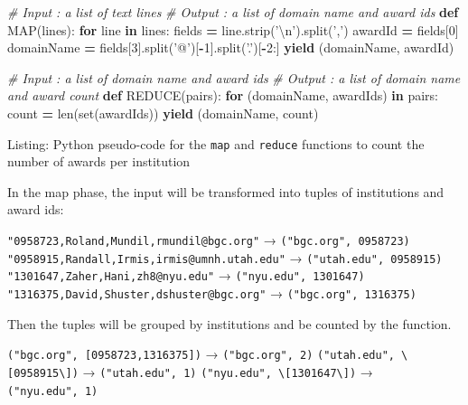 \documentclass[]{krantz}
\newenvironment{Shaded}{\begin{snugshade}}{\end{snugshade}}
\newcommand{\KeywordTok}[1]{\textcolor[rgb]{0.13,0.29,0.53}{\textbf{#1}}}
\newcommand{\DecValTok}[1]{\textcolor[rgb]{0.00,0.00,0.81}{#1}}
\newcommand{\CharTok}[1]{\textcolor[rgb]{0.31,0.60,0.02}{#1}}
\newcommand{\StringTok}[1]{\textcolor[rgb]{0.31,0.60,0.02}{#1}}
\newcommand{\CommentTok}[1]{\textcolor[rgb]{0.56,0.35,0.01}{\textit{#1}}}
\newcommand{\ControlFlowTok}[1]{\textcolor[rgb]{0.13,0.29,0.53}{\textbf{#1}}}
\newcommand{\OperatorTok}[1]{\textcolor[rgb]{0.81,0.36,0.00}{\textbf{#1}}}
\newcommand{\BuiltInTok}[1]{#1}
\newcommand{\NormalTok}[1]{#1}
\begin{document}
\begin{Shaded}
\begin{Highlighting}[]
\CommentTok{# Input  : a list of text lines}
\CommentTok{# Output : a list of domain name and award ids}
\KeywordTok{def}\NormalTok{ MAP(lines):}
    \ControlFlowTok{for}\NormalTok{ line }\KeywordTok{in}\NormalTok{ lines:}
\NormalTok{        fields     }\OperatorTok{=}\NormalTok{ line.strip(}\StringTok{'}\CharTok{\textbackslash{}n}\StringTok{'}\NormalTok{).split(}\StringTok{','}\NormalTok{)}
\NormalTok{        awardId    }\OperatorTok{=}\NormalTok{ fields[}\DecValTok{0}\NormalTok{]}
\NormalTok{        domainName }\OperatorTok{=}\NormalTok{ fields[}\DecValTok{3}\NormalTok{].split(}\StringTok{'@'}\NormalTok{)[}\OperatorTok{-}\DecValTok{1}\NormalTok{].split(}\StringTok{'.'}\NormalTok{)[}\OperatorTok{-}\DecValTok{2}\NormalTok{:]}
        \ControlFlowTok{yield}\NormalTok{ (domainName, awardId)}

\CommentTok{# Input  : a list of domain name and award ids}
\CommentTok{# Output : a list of domain name and award count}
\KeywordTok{def}\NormalTok{ REDUCE(pairs):}
    \ControlFlowTok{for}\NormalTok{ (domainName, awardIds) }\KeywordTok{in}\NormalTok{ pairs:}
\NormalTok{        count }\OperatorTok{=} \BuiltInTok{len}\NormalTok{(}\BuiltInTok{set}\NormalTok{(awardIds))}
        \ControlFlowTok{yield}\NormalTok{ (domainName, count)}
\end{Highlighting}
\end{Shaded}

Listing: Python pseudo-code for the \texttt{map} and \texttt{reduce}
functions to count the number of awards per institution

In the map phase, the input will be transformed into tuples of
institutions and award ids:

\texttt{"0958723,Roland,Mundil,rmundil@bgc.org"} →
\texttt{("bgc.org",\ 0958723)}
\texttt{"0958915,Randall,Irmis,irmis@umnh.utah.edu"} →
\texttt{("utah.edu",\ 0958915)}
\texttt{"1301647,Zaher,Hani,zh8@nyu.edu"} →
\texttt{("nyu.edu",\ 1301647)}
\texttt{"1316375,David,Shuster,dshuster@bgc.org"} →
\texttt{("bgc.org",\ 1316375)}

Then the tuples will be grouped by institutions and be counted by the
function.

\texttt{("bgc.org",\ {[}0958723,1316375{]})} → \texttt{("bgc.org",\ 2)}
\texttt{("utah.edu",\ \textbackslash{}{[}0958915\textbackslash{}{]})} →
\texttt{("utah.edu",\ 1)}
\texttt{("nyu.edu",\ \textbackslash{}{[}1301647\textbackslash{}{]})} →
\texttt{("nyu.edu",\ 1)}
\end{document}
